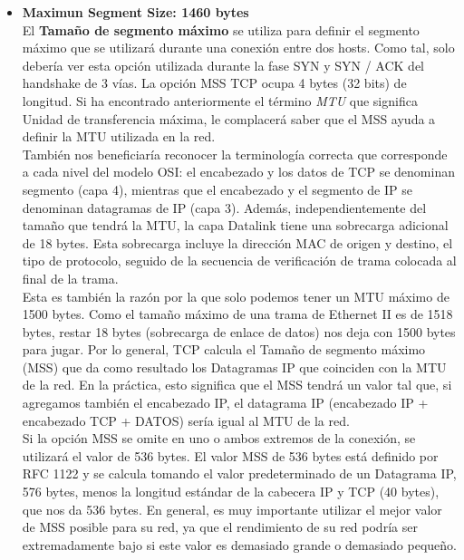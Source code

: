\documentclass[osajnl,twocolumn,showpacs,superscriptaddress,10pt]{revtex4-1} %
\begin{document}
\begin{itemize}
    \item \textbf{Maximun Segment Size: 1460 bytes} \\

    El \textbf{Tamaño de segmento máximo} se utiliza para definir el segmento máximo que se utilizará durante una conexión entre dos hosts. 
    Como tal, solo debería ver esta opción utilizada durante la fase SYN y SYN / ACK del handshake de 3 vías. La opción MSS TCP 
    ocupa 4 bytes (32 bits) de longitud. Si ha encontrado anteriormente el término \textit{MTU} que significa Unidad de transferencia 
    máxima, le complacerá saber que el MSS ayuda a definir la MTU utilizada en la red. \\
    
    También nos beneficiaría reconocer la terminología correcta que corresponde a cada nivel del modelo OSI: el encabezado y los 
    datos de TCP se denominan segmento (capa 4), mientras que el encabezado y el segmento de IP se denominan datagramas de IP (capa 3). 
    Además, independientemente del tamaño que tendrá la MTU, la capa Datalink tiene una sobrecarga adicional de 18 bytes. 
    Esta sobrecarga incluye la dirección MAC de origen y destino, el tipo de protocolo, seguido de la secuencia de verificación de 
    trama colocada al final de la trama. \\

    Esta es también la razón por la que solo podemos tener un MTU máximo de 1500 bytes. Como el tamaño máximo de una trama de 
    Ethernet II es de 1518 bytes, restar 18 bytes (sobrecarga de enlace de datos) nos deja con 1500 bytes para jugar. Por lo general, 
    TCP calcula el Tamaño de segmento máximo (MSS) que da como resultado los Datagramas IP que coinciden con la MTU de la red. 
    En la práctica, esto significa que el MSS tendrá un valor tal que, si agregamos también el encabezado IP, el datagrama IP 
    (encabezado IP + encabezado TCP + DATOS) sería igual al MTU de la red. \\

    Si la opción MSS se omite en uno o ambos extremos de la conexión, se utilizará el valor de 536 bytes. El valor MSS de 536 
    bytes está definido por RFC 1122 y se calcula tomando el valor predeterminado de un Datagrama IP, 576 bytes, menos la 
    longitud estándar de la cabecera IP y TCP (40 bytes), que nos da 536 bytes. En general, es muy importante utilizar el mejor 
    valor de MSS posible para su red, ya que el rendimiento de su red podría ser extremadamente bajo si este valor es 
    demasiado grande o demasiado pequeño. \\


\end{itemize}
\end{document}
